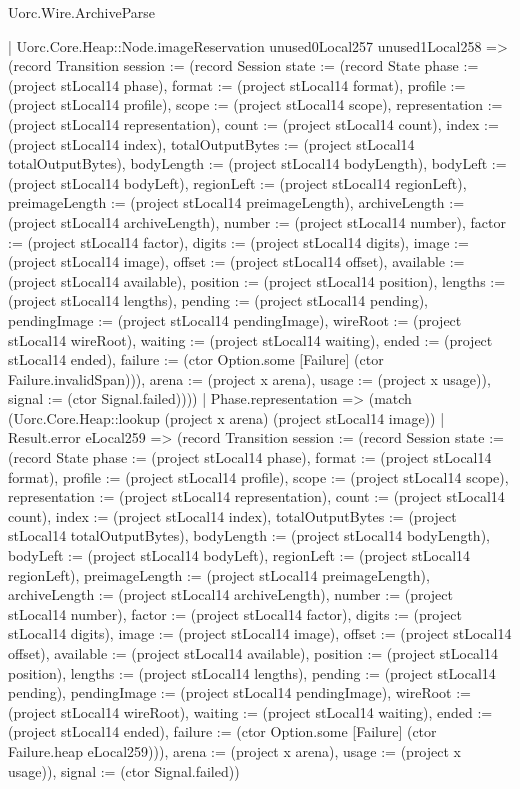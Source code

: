 \begin{lexlean}{Uorc.Wire.ArchiveParse}
\begin{semanticmodule}
{            | Uorc.Core.Heap::Node.imageReservation unused0Local257 unused1Local258 => (record Transition {session := (record Session {state := (record State {phase := (project stLocal14 phase), format := (project stLocal14 format), profile := (project stLocal14 profile), scope := (project stLocal14 scope), representation := (project stLocal14 representation), count := (project stLocal14 count), index := (project stLocal14 index), totalOutputBytes := (project stLocal14 totalOutputBytes), bodyLength := (project stLocal14 bodyLength), bodyLeft := (project stLocal14 bodyLeft), regionLeft := (project stLocal14 regionLeft), preimageLength := (project stLocal14 preimageLength), archiveLength := (project stLocal14 archiveLength), number := (project stLocal14 number), factor := (project stLocal14 factor), digits := (project stLocal14 digits), image := (project stLocal14 image), offset := (project stLocal14 offset), available := (project stLocal14 available), position := (project stLocal14 position), lengths := (project stLocal14 lengths), pending := (project stLocal14 pending), pendingImage := (project stLocal14 pendingImage), wireRoot := (project stLocal14 wireRoot), waiting := (project stLocal14 waiting), ended := (project stLocal14 ended), failure := (ctor Option.some [Failure] (ctor Failure.invalidSpan))}), arena := (project x arena), usage := (project x usage)}), signal := (ctor Signal.failed)})))
        | Phase.representation => (match (Uorc.Core.Heap::lookup (project x arena) (project stLocal14 image))
          | Result.error eLocal259 => (record Transition {session := (record Session {state := (record State {phase := (project stLocal14 phase), format := (project stLocal14 format), profile := (project stLocal14 profile), scope := (project stLocal14 scope), representation := (project stLocal14 representation), count := (project stLocal14 count), index := (project stLocal14 index), totalOutputBytes := (project stLocal14 totalOutputBytes), bodyLength := (project stLocal14 bodyLength), bodyLeft := (project stLocal14 bodyLeft), regionLeft := (project stLocal14 regionLeft), preimageLength := (project stLocal14 preimageLength), archiveLength := (project stLocal14 archiveLength), number := (project stLocal14 number), factor := (project stLocal14 factor), digits := (project stLocal14 digits), image := (project stLocal14 image), offset := (project stLocal14 offset), available := (project stLocal14 available), position := (project stLocal14 position), lengths := (project stLocal14 lengths), pending := (project stLocal14 pending), pendingImage := (project stLocal14 pendingImage), wireRoot := (project stLocal14 wireRoot), waiting := (project stLocal14 waiting), ended := (project stLocal14 ended), failure := (ctor Option.some [Failure] (ctor Failure.heap eLocal259))}), arena := (project x arena), usage := (project x usage)}), signal := (ctor Signal.failed)})
}
\end{semanticmodule}
\end{lexlean}
